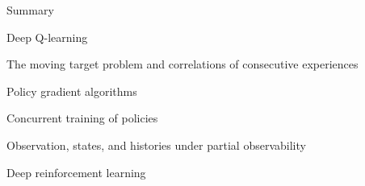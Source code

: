 %
%

\begin{frame}{Summary}

    \blist
        \item Deep Q-learning
        \item The moving target problem and correlations of consecutive experiences
        \item Policy gradient algorithms
        \item Concurrent training of policies
        \item Observation, states, and histories under partial observability
    \elist


    \blist
        \item Deep  reinforcement learning 
    \elist
    
\end{frame}


